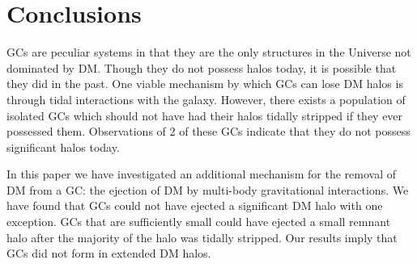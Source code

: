\documentclass[aps,floatfix,prd,showpacs]{revtex4}
\begin{document}
\section{Conclusions}
\label{section:conclusions}


GCs are peculiar systems in that they are the only structures in the Universe not dominated by DM.  Though they do not possess halos today, it is possible that they did in the past.  One viable mechanism by which GCs can lose DM halos is through tidal interactions with the galaxy.  However, there exists a population of isolated GCs which should not have had their halos tidally stripped if they ever possessed them.  Observations of 2 of these GCs indicate that they do not possess significant halos today.


In this paper we have investigated an additional mechanism for the removal of DM from a GC:  the ejection of DM by multi-body gravitational interactions.  We have found that GCs could not have ejected a significant DM halo with one exception.  GCs that are sufficiently small could have ejected a small remnant halo after the majority of the halo was tidally stripped.  Our results imply that GCs did not form in extended DM halos.  


\acknowledgments


\end{document}
